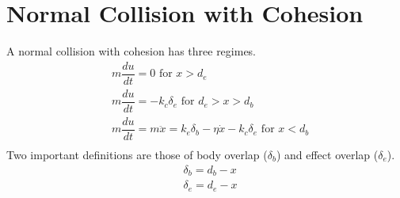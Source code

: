 \documentclass[10pt,a4paper,titlepage]{report}
\begin{document}
\section{Normal Collision with Cohesion}
\label{der:normal collision with cohesion}
A normal collision with cohesion has three regimes.
\begin{align*}
&m\dfrac{du}{dt} = 0 \text{ for } x > d_e \\
&m\dfrac{du}{dt} = - k_c \delta_e \text{ for } d_e > x > d_b \\
&m \dfrac{du}{dt} = m \ddot{x} = k_e \delta_b - \eta \dot{x} - k_c \delta_e \text{ for } x < d_b \\
\end{align*}
Two important definitions are those of body overlap ($\delta_b$) and effect overlap ($\delta_e$).
\begin{align*}
&\delta_b = d_b - x \\
&\delta_e = d_e - x \\
\end{align*}
\end{document}
